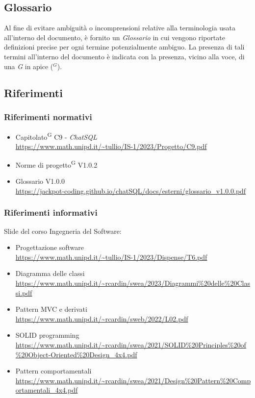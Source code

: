 \documentclass[5pt]{article}
\begin{document}
	\subsection{Glossario}
    Al fine di evitare ambiguità o incomprensioni relative alla terminologia usata all'interno del documento, è fornito un \textit{Glossario} in cui vengono riportate definizioni precise per ogni termine potenzialmente ambiguo. La presenza di tali termini all'interno del documento è indicata con la presenza, vicino alla voce, di una \textit{G} in apice ($^G$). 
	\subsection{Riferimenti}
	\subsubsection{Riferimenti normativi}
	\begin{itemize}
		\item Capitolato\textsuperscript{G} C9 - \textit{ChatSQL} \\ \url{https://www.math.unipd.it/~tullio/IS-1/2023/Progetto/C9.pdf}
		\item Norme di progetto\textsuperscript{G} V1.0.2
		\item Glossario V1.0.0 \\
		\url{https://jackpot-coding.github.io/chatSQL/docs/esterni/glossario_v1.0.0.pdf}
	\end{itemize}
	\subsubsection{Riferimenti informativi}
	Slide del corso Ingegneria del Software:
	\begin{itemize}
		\item Progettazione software \\
		\url{https://www.math.unipd.it/~tullio/IS-1/2023/Dispense/T6.pdf}
		\item Diagramma delle classi \\
		\url{https://www.math.unipd.it/~rcardin/swea/2023/Diagrammi%20delle%20Classi.pdf}
		\item Pattern MVC e derivati \\
		\url{https://www.math.unipd.it/~rcardin/sweb/2022/L02.pdf}
		\item SOLID programming \\
		\url{https://www.math.unipd.it/~rcardin/swea/2021/SOLID%20Principles%20of%20Object-Oriented%20Design_4x4.pdf}
		\item Pattern comportamentali \\
		\url{https://www.math.unipd.it/~rcardin/swea/2021/Design%20Pattern%20Comportamentali_4x4.pdf}
	\end{itemize}
	
\end{document}
